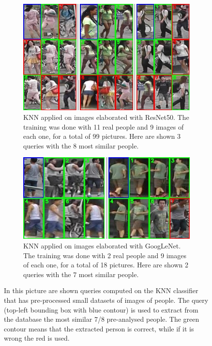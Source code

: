 \begin{figure}[!h]
	\centering
	\begin{subfigure}{1\textwidth}
		\includegraphics[width=\linewidth]{images/recognition/knn_resNet_s9n99}
		\captionsetup{margin=0.5cm}
		\caption{KNN applied on images elaborated with ResNet50. The training was done with 11 real people and 9 images of each one, for a total of 99 pictures. Here are shown 3 queries with the 8 most similar people.}
		\label{fig:knn_resNet_s9n99}
	\end{subfigure}
	\par\bigskip %
	\begin{subfigure}{1\textwidth}
		\includegraphics[width=\linewidth]{images/recognition/knn_googleNet_s9n18}
		\captionsetup{margin=0.5cm}
		\caption{KNN applied on images elaborated with GoogLeNet. The training was done with 2 real people and 9 images of each one, for a total of 18 pictures. Here are shown 2 queries with the 7 most similar people.}
		\label{fig:knn_googleNet_s9n18}
	\end{subfigure}
	\captionsetup{margin=0.5cm}
	\caption[KNN applied with image classifier to solve the person re-identification task.]{In this picture are shown queries computed on the KNN classifier that has pre-processed small datasets of images of people. The query (top-left bounding box with blue contour) is used to extract from the database the most similar 7/8 pre-analysed people. The green contour means that the extracted person is correct, while if it is wrong the red is used.}
	\label{fig:knn_reID_examples}
\end{figure}